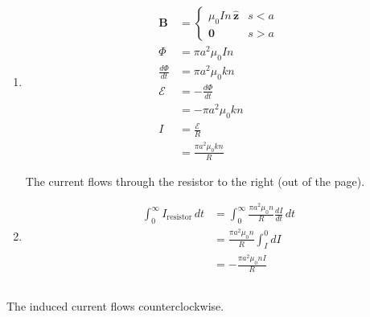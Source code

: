 \documentclass{article}
\renewcommand{\vec}[1]{\boldsymbol{\mathbf{#1}}}
\newcommand{\uvec}[1]{\hat{\vec{#1}}}
\begin{document}
\begin{enumerate}
  \item

        \begin{align*}
          \vec{B}            & = \begin{cases}
                                   \mu_0 I n \,\uvec{z} & s < a \\
                                   \vec{0}              & s > a
                                 \end{cases} \\
          \Phi               & = \pi a^2 \mu_0 I n            \\
          \frac{d \Phi}{d t} & = \pi a^2 \mu_0 k n            \\
          \mathcal{E}        & = -\frac{d \Phi}{d t}          \\
                             & = -\pi a^2 \mu_0 k n           \\
          I                  & = \frac{\mathcal{E}}{R}        \\
                             & = \frac{\pi a^2 \mu_0 k n}{R}
        \end{align*}

        The current flows through the resistor to the right (out of the page).

  \item

        \begin{align*}
          \int_0^\infty I_\text{resistor} \,d t & = \int_0^\infty \frac{\pi a^2 \mu_0 n}{R} \frac{d I}{d t} \,d t \\
                                                & = \frac{\pi a^2 \mu_0 n}{R} \int_I^0 d I                        \\
                                                & = -\frac{\pi a^2 \mu_0 n I}{R}
        \end{align*}
\end{enumerate}

\subsection{}

The induced current flows counterclockwise.
\end{document}
